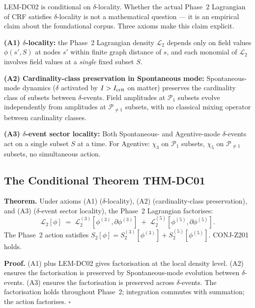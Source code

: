 \documentclass[12pt, a4paper]{article}
\begin{document}
LEM-DC02 is conditional on $\delta$-locality. Whether the actual
Phase~2 Lagrangian of CRF satisfies $\delta$-locality is not a
mathematical question --- it is an empirical claim about the
foundational corpus. Three axioms make this claim explicit.

\begin{formalbox}[title={Axioms (A1), (A2), (A3) of TASK-ZC04}]
\textbf{(A1) $\delta$-locality:} the Phase~2 Lagrangian density
$\mathcal{L}_2$ depends only on field values $\phi(s', S)$ at nodes
$s'$ within finite graph distance of $s$, and each monomial of
$\mathcal{L}_2$ involves field values at a \emph{single} fixed
subset $S$.

\textbf{(A2) Cardinality-class preservation in Spontaneous mode:}
Spontaneous-mode dynamics ($\delta$ activated by $I > I_{\rm crit}$
on matter) preserves the cardinality class of subsets between
$\delta$-events. Field amplitudes at $\mathcal{P}_1$ subsets evolve
independently from amplitudes at $\mathcal{P}_{\ne 1}$ subsets, with
no classical mixing operator between cardinality classes.

\textbf{(A3) $\delta$-event sector locality:} Both Spontaneous- and
Agentive-mode $\delta$-events act on a single subset $S$ at a time.
For Agentive: $\chi_3$ on $\mathcal{P}_1$ subsets,
$\chi_5$ on $\mathcal{P}_{\ne 1}$ subsets, no simultaneous action.
\end{formalbox}

\subsection{The Conditional Theorem THM-DC01}

\begin{formalbox}[title={THM-DC01: Dynamic CRT (Conditional)
  --- TASK-ZC04 Headline}]
\textbf{Theorem.} Under axioms (A1) ($\delta$-locality), (A2)
(cardinality-class preservation), and (A3) ($\delta$-event sector
locality), the Phase~2 Lagrangian factorises:
\begin{equation}
  \boxed{\;
  \mathcal{L}_2[\phi]
  \;=\;
  \mathcal{L}_2^{(3)}[\phi^{(3)}, \partial \phi^{(3)}]
  \;+\;
  \mathcal{L}_2^{(5)}[\phi^{(5)}, \partial \phi^{(5)}].
  \;}
  \label{eq:THM-DC01}
\end{equation}
The Phase~2 action satisfies $S_2[\phi] = S_2^{(3)}[\phi^{(3)}] +
S_2^{(5)}[\phi^{(5)}]$. CONJ-Z201 holds.

\textbf{Proof.} (A1) plus LEM-DC02 gives factorisation at the local
density level. (A2) ensures the factorisation is preserved by
Spontaneous-mode evolution between $\delta$-events. (A3) ensures the
factorisation is preserved across $\delta$-events. The factorisation
holds throughout Phase~2; integration commutes with summation;
the action factorises. \hfill$\square$
\end{formalbox}
\end{document}
